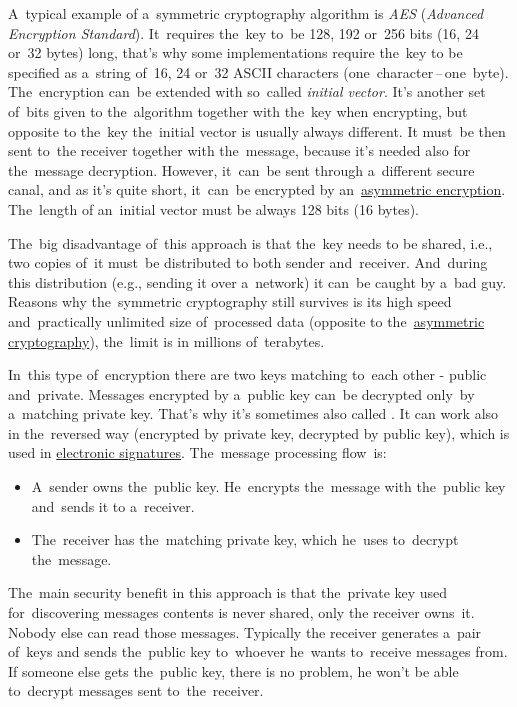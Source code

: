 A~typical example of a~symmetric cryptography algorithm is \textit{AES} (\textit{Advanced Encryption Standard}).
It~requires the~key to~be 128, 192 or~256 bits (16, 24 or~32 bytes) long, that's why some implementations require the~key to be specified as a~string of~16, 24 or~32 ASCII characters (one~character\,--\,one~byte).
The~encryption can~be extended with so~called \textit{initial vector}.
It's another set of~bits given to the~algorithm together with the~key when encrypting, but opposite to the~key the~initial vector is usually always different.
It must~be then sent to~the receiver together with the~message, because it's needed also for the~message decryption.
However, it~can~be sent through a~different secure canal, and as it's quite short, it~can~be encrypted by an~\hyperref[asymmetriccryptography]{asymmetric encryption}.
The~length of an~initial vector must be always 128 bits (16 bytes).

The~big disadvantage of~this approach is that the~key needs to be shared, i.e., two copies of~it must~be distributed to both sender and~receiver.
And~during this distribution (e.g., sending it over a~network) it can~be caught by a~bad guy.
Reasons why the~symmetric cryptography still survives is its high speed and~practically unlimited size of~processed data (opposite to the~\hyperref[asymmetriccryptography]{asymmetric cryptography}), the~limit is in millions of~\mbox{terabytes}.

\label{asymmetriccryptography}
In~this type of~encryption there are two keys matching to~each other - public and~private.
Messages encrypted by a~public key can~be decrypted only~by a~matching private key.
That's why it's sometimes also called .
It can work also in the~reversed way (encrypted by private key, decrypted by public key), which is used in \hyperref[electronicsignature]{electronic signatures}.
The~message processing flow~is:
\begin{itemize}
    \item A~sender owns the~public key.
          He~encrypts the~message with the~public key and~sends it to a~receiver.
    \item The~receiver has the~matching private key, which he~uses to~decrypt the~message.
\end{itemize}

\noindent The~main security benefit in this approach is that the~private key used for~discovering messages contents is never shared, only the receiver owns~it.
Nobody else can read those messages.
Typically the receiver generates a~pair of~keys and sends the~public key to~whoever he~wants to~receive messages from.
If someone else gets the~public key, there is no problem, he won't be able to~decrypt messages sent to~the~receiver.
\newpage

